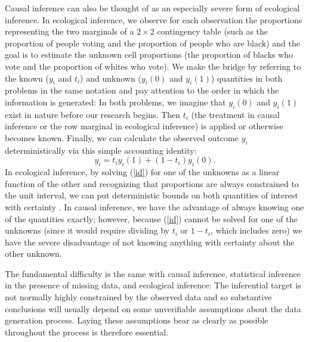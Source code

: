 \documentclass[11pt,titlepage]{article}
\begin{document}
Causal inference can also be thought of as an especially severe form
of ecological inference.  In ecological inference, we observe for each
observation the proportions representing the two marginals of a
$2\times 2$ contingency table (such as the proportion of people voting
and the proportion of people who are black) and the goal is to
estimate the unknown cell proportions (the proportion of blacks who
vote and the proportion of whites who vote).  We make the bridge by
referring to the known ($y_i$ and $t_i$) and unknown ($y_i(0)$ and
$y_i(1)$) quantities in both problems in the same notation and pay
attention to the order in which the information is generated: In both
problems, we imagine that $y_i(0)$ and $y_i(1)$ exist in nature before
our research begins.  Then $t_i$ (the treatment in causal inference or
the row marginal in ecological inference) is applied or otherwise
becomes known.  Finally, we can calculate the observed outcome $y_i$
deterministically via this simple accounting identity:
\begin{equation}
  \label{id}
  y_i = t_iy_i(1) + (1-t_i)y_i(0).
\end{equation}
In ecological inference, by solving (\ref{id}) for one of the unknowns
as a linear function of the other and recognizing that proportions are
always constrained to the unit interval, we can put deterministic
bounds on both quantities of interest with certainty
\citep[][ch.5]{King97}.  In causal inference, we have the advantage of
always knowing one of the quantities exactly; however, because
(\ref{id}) cannot be solved for one of the unknowns (since it would
require dividing by $t_i$ or $1-t_i$, which includes zero) we have the
severe disadvantage of not knowing anything with certainty about the
other unknown.

The fundamental difficulty is the same with causal inference,
statistical inference in the presence of missing data, and ecological
inference: The inferential target is not normally highly constrained
by the observed data and so substantive conclusions will usually
depend on some unverifiable assumptions about the data generation
process.  Laying these assumptions bear as clearly as possible
throughout the process is therefore essential.
\end{document}
